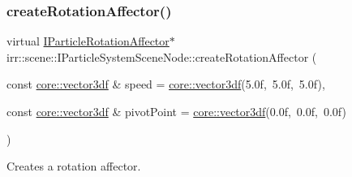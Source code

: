 \mbox{\label{classirr_1_1scene_1_1IParticleSystemSceneNode_a7a09b7ebc0d4a2d164233c42689623d6}} 
\subsubsection{\texorpdfstring{create\+Rotation\+Affector()}{createRotationAffector()}}
{\footnotesize\ttfamily virtual \hyperlink{classirr_1_1scene_1_1IParticleRotationAffector}{I\+Particle\+Rotation\+Affector}$\ast$ irr\+::scene\+::\+I\+Particle\+System\+Scene\+Node\+::create\+Rotation\+Affector (\begin{DoxyParamCaption}\item[{const \hyperlink{namespaceirr_1_1core_a06f169d08b5c429f5575acb7edbad811}{core\+::vector3df} \&}]{speed = {\ttfamily \hyperlink{namespaceirr_1_1core_a06f169d08b5c429f5575acb7edbad811}{core\+::vector3df}(5.0f,~5.0f,~5.0f)},  }\item[{const \hyperlink{namespaceirr_1_1core_a06f169d08b5c429f5575acb7edbad811}{core\+::vector3df} \&}]{pivot\+Point = {\ttfamily \hyperlink{namespaceirr_1_1core_a06f169d08b5c429f5575acb7edbad811}{core\+::vector3df}(0.0f,~0.0f,~0.0f)} }\end{DoxyParamCaption})\hspace{0.3cm}{\ttfamily [pure virtual]}}



Creates a rotation affector. 


